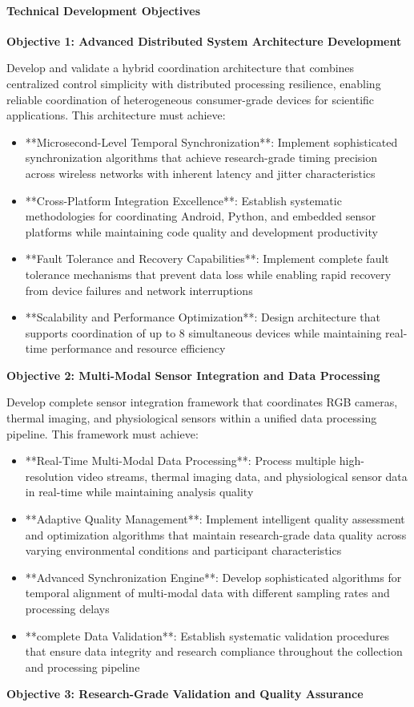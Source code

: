 \documentclass[11pt,a4paper]{article}
\begin{document}
\paragraph{Technical Development Objectives}

\textbf{Objective 1: Advanced Distributed System Architecture Development}

Develop and validate a hybrid coordination architecture that combines
centralized control simplicity with distributed
processing resilience, enabling reliable coordination of heterogeneous
consumer-grade devices for scientific
applications. This architecture must achieve:

\begin{itemize}
\item **Microsecond-Level Temporal Synchronization**: Implement sophisticated
synchronization algorithms that achieve
research-grade timing precision across wireless networks with inherent latency
and jitter characteristics
\item **Cross-Platform Integration Excellence**: Establish systematic
methodologies for coordinating Android, Python, and
embedded sensor platforms while maintaining code quality and development
productivity
\item **Fault Tolerance and Recovery Capabilities**: Implement complete fault
tolerance mechanisms that prevent data
loss while enabling rapid recovery from device failures and network
interruptions
\item **Scalability and Performance Optimization**: Design architecture that
supports coordination of up to 8 simultaneous
  devices while maintaining real-time performance and resource efficiency

\end{itemize}
\textbf{Objective 2: Multi-Modal Sensor Integration and Data Processing}

Develop complete sensor integration framework that coordinates RGB cameras,
thermal imaging, and physiological
sensors within a unified data processing pipeline. This framework must achieve:

\begin{itemize}
\item **Real-Time Multi-Modal Data Processing**: Process multiple
high-resolution video streams, thermal imaging data, and
  physiological sensor data in real-time while maintaining analysis quality
\item **Adaptive Quality Management**: Implement intelligent quality assessment
and optimization algorithms that maintain
research-grade data quality across varying environmental conditions and
participant characteristics
\item **Advanced Synchronization Engine**: Develop sophisticated algorithms for
temporal alignment of multi-modal data with
  different sampling rates and processing delays
\item **complete Data Validation**: Establish systematic validation procedures
that ensure data integrity and research
  compliance throughout the collection and processing pipeline

\end{itemize}
\textbf{Objective 3: Research-Grade Validation and Quality Assurance}
\end{document}
